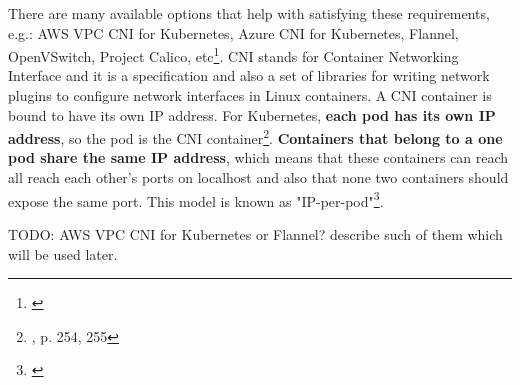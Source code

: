 There are many available options that help with satisfying these requirements, e.g.: AWS VPC CNI for Kubernetes, Azure CNI for Kubernetes, Flannel, OpenVSwitch, Project Calico, etc\footnote{\cite{k8s-net}}. CNI stands for Container Networking Interface and it is a specification and also a set of libraries for writing network plugins to configure network interfaces in Linux containers. A CNI container is bound to have its own IP address. For Kubernetes, \textbf{each pod has its own IP address}, so the pod is the CNI container\footnote{\cite{book-mastering-k8s}, p. 254, 255}. \textbf{Containers that belong to a one pod share the same IP address}, which means that these containers can reach all reach each other’s ports on localhost and also that none two containers should expose the same port. This model is known as "IP-per-pod"\footnote{\cite{k8s-net}}.

TODO: AWS VPC CNI for Kubernetes or Flannel? describe such of them which will be used later.
